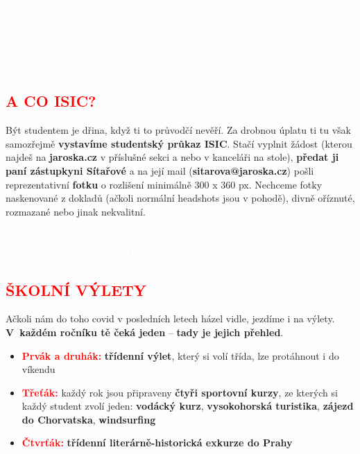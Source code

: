 \documentclass[a5paper, twoside]{article}
\newcommand{\boxik}[3]{
  \begin{tcolorbox}[
    sharp corners,
    colback = #1,
    boxrule = 0pt,
    grow to left by = 25pt,
    grow to right by = 25pt,
    right = 22pt,
    left = 22pt%
  ]
    \textcolor{#2}{#3}
  \end{tcolorbox}
}
\newcommand{\polonadpis}[4]{
  \vspace*{-50pt}
  \begin{tcolorbox}[colback = #2, boxrule = 0pt, grow to left by = #4,  grow to right by = #4, arc=8pt, height = 30pt]
    \vspace*{5pt}
    \centering \subsection*{\textcolor{#3}{#1}}
  \end{tcolorbox}
}
\newcommand{\podnadpis}[2]{
  \subsection*{\textcolor{#2}{#1}}
}
\begin{document}
\boxik{red}{white}{\textbf{Poznámka.} Ne že bys nejen nesměl jezdit zdravý výtahem, ono to taky dost dobře nejde. Bez oprávnění na čipu tě výtah prostě nebude poslouchat a nepřijede ti. Když už je mysteriózně otevřen na patře prázdný, nikdo ti asi nebude fyzicky bránit do něj naskočit a odjet – ale pokud tě při tom načapá profesor, který to nemá rád, dostaneš bídu. Takže bacha.}

\podnadpis{A CO ISIC?}{red}
Být studentem je dřina, když ti to průvodčí nevěří. Za drobnou úplatu ti tu však samozřejmě \textbf{vystavíme studentský průkaz ISIC}. Stačí vyplnit žádost (kterou najdeš na {\bf jaroska.cz} v příslušné sekci a nebo v kanceláři na stole), \textbf{předat ji paní zástupkyni Sítařové} a na její mail (\textbf{sitarova@jaroska.cz}) pošli reprezentativní \textbf{fotku} o rozlišení minimálně 300 x 360 px. Nechceme fotky naskenované z dokladů (ačkoli normální headshots jsou v pohodě), divně oříznuté, rozmazané nebo jinak
nekvalitní.

\newpage

\polonadpis{I. Jak to u nás chodí}{red}{white}{-4.1cm}

\podnadpis{ŠKOLNÍ VÝLETY}{red}
Ačkoli nám do toho covid v posledních letech házel vidle, jezdíme i na výlety.
\textbf{V~každém ročníku tě čeká jeden} -- \textbf{tady je jejich přehled}.

\begin{itemize}[leftmargin=10pt]
	\item \textcolor{red}{\textbf{Prvák a druhák:}} \textbf{třídenní výlet}, který si volí třída, lze protáhnout i do víkendu
	\item \textcolor{red}{\textbf{Třeťák:}} každý rok jsou připraveny \textbf{čtyři sportovní kurzy}, ze kterých si každý student zvolí jeden: \textbf{vodácký kurz}, \textbf{vysokohorská turistika}, \textbf{zájezd do Chorvatska}, \textbf{windsurfing}
	\item \textcolor{red}{\textbf{Čtvrťák:}} \textbf{třídenní literárně-historická exkurze do Prahy}
\end{itemize}
\end{document}
